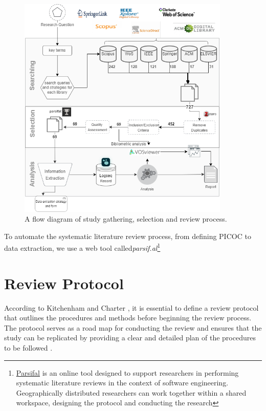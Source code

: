 \begin{figure}[H]
    \centering
    \caption{A flow diagram of study gathering, selection and review process.}
    \includegraphics[width=0.9\textwidth]{images/newimages/slrmethoddiagram.drawio.png}
    
    \label{fig:slr-proc}
\end{figure}


To automate the systematic literature review process, from defining PICOC to data extraction, we use a web tool called\textit{parsif.al}\footnote{\href{https://parsif.al}{Parsifal} is an online tool designed to support researchers in performing systematic literature reviews in the context of software engineering. Geographically distributed researchers can work together within a shared workspace, designing the protocol and conducting the research}


\section{Review Protocol}
According to Kitchenham and Charter  \cite{kitchenham_guidelines_2007}, it is essential to define a review protocol that outlines the procedures and methods before beginning the review process. The protocol serves as a road map for conducting the review and ensures that the study can be replicated by providing a clear and detailed plan of the procedures to be followed \cite{carrera-rivera_how-conduct_2022}.

